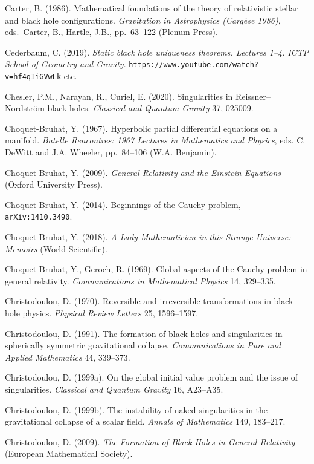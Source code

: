 \documentclass[11pt,a4paper]{article}
\begin{document}
\begin{small}
\begin{thebibliography}{99}
\item[] Carter, B. (1986). Mathematical foundations of the theory of relativistic stellar and black hole configurations.
\emph{Gravitation in Astrophysics (Carg\`{e}se 1986)}, eds.\ Carter, B., Hartle, J.B., 
pp.\ 63--122 (Plenum Press). 
\item[]  Cederbaum, C. (2019). \emph{Static black hole uniqueness theorems. Lectures 1--4. ICTP School of Geometry and Gravity}. 
\verb#https://www.youtube.com/watch?v=hf4qIiGVwLk# etc.
\item[]  Chesler, P.M.,  Narayan, R.,  Curiel, E. (2020). Singularities in Reissner--Nordstr\"{o}m black holes.
 \emph{Classical and Quantum Gravity} 37, 025009.  
\item[] Choquet-Bruhat, Y. (1967).  Hyperbolic partial differential equations on a manifold.
\emph{Batelle Rencontres: 1967 Lectures in Mathematics and Physics}, eds. 
 C. DeWitt and J.A. Wheeler, pp.\ 84--106 (W.A. Benjamin). 
 \item[]  Choquet-Bruhat, Y. (2009). \emph{General Relativity and the Einstein Equations} (Oxford University Press). 
\item[]  Choquet-Bruhat, Y. (2014). Beginnings of the Cauchy problem, \texttt{arXiv:1410.3490}.
\item[] Choquet-Bruhat, Y. (2018). \emph{A Lady Mathematician in this Strange Universe: Memoirs} (World Scientific).
\item[] Choquet-Bruhat, Y.,  Geroch, R. (1969). Global aspects of the Cauchy problem in general relativity.
 \emph{Communications in Mathematical Physics} 14, 329--335.
 \item[]
 Christodoulou, D. (1970). Reversible and irreversible transformations in black-hole physics. \emph{Physical
Review Letters} 25, 1596--1597.
  \item[] Christodoulou, D.  (1991). The formation of black holes and singularities in spherically symmetric gravitational collapse. 
  \emph{Communications in Pure and Applied Mathematics} 44, 339--373.
 \item[] Christodoulou, D. (1999a). On the global initial value problem and the issue of singularities.
\emph{Classical and Quantum Gravity} 16, A23--A35. 
 \item[] Christodoulou, D. (1999b). The instability of naked singularities in the gravitational collapse of a scalar field.
 \emph{ Annals of Mathematics} 149, 183--217. 
 \item[]  Christodoulou, D. (2009). \emph{The Formation of Black Holes in General Relativity} (European Mathematical Society). 

\end{thebibliography}
\end{small}
\end{document}
